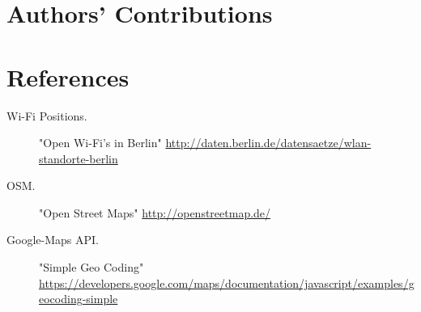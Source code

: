 \section*{Authors' Contributions}

\begin{description}
\setlength{\itemsep}{0pt}
  \item[Andreas Ergenzinger] \todo{}
  \item[Josua Krause] \todo{}
\end{description}

\section*{References}

\begin{description}
\item[Wi-Fi Positions.] "Open Wi-Fi's in Berlin" 
  \url{http://daten.berlin.de/datensaetze/wlan-standorte-berlin}
\item[OSM.] "Open Street Maps" 
  \url{http://openstreetmap.de/}
\item[Google-Maps API.] "Simple Geo Coding"
  \url{https://developers.google.com/maps/documentation/javascript/examples/geocoding-simple} 
\end{description}
